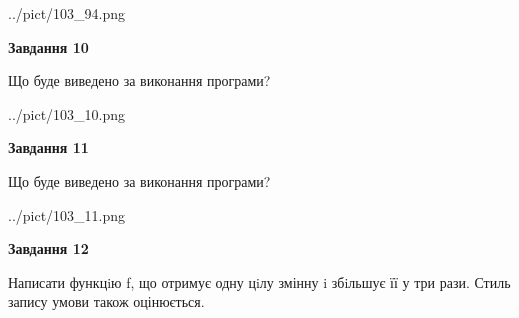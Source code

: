 \documentclass[12pt, ukrainian]{article}
\begin{document}
{\begin {large}
\begin{center}
	{../pict/103_94.png}
\end{center}
\newpage

{\begin {center}\textbf{Завдання 10}\end {center}}

Що буде виведено за виконання програми?\par
\begin{center}
	{../pict/103_10.png}
\end{center}
\newpage

{\begin {center}\textbf{Завдання 11}\end {center}}

Що буде виведено за виконання програми?\par
\begin{center}
	{../pict/103_11.png}
\end{center}
\newpage

{\begin {center}\textbf{Завдання 12}\end {center}}


Написати функцiю f, що отримує одну цiлу змінну i збiльшує її у три рази. Стиль запису умови також оцінюється.\par
\newpage

\end {large}}
\end{document}
